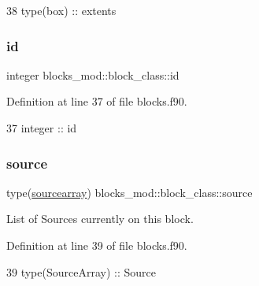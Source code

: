 \begin{DoxyCode}
38         \textcolor{keywordtype}{type}(box) :: extents
\end{DoxyCode}
\mbox{\label{structblocks__mod_1_1block__class_addd1a493d56aa1ffd1bc27c56b682065}} 
\subsubsection{\texorpdfstring{id}{id}}
{\footnotesize\ttfamily integer blocks\+\_\+mod\+::block\+\_\+class\+::id\hspace{0.3cm}{\ttfamily [private]}}



Definition at line 37 of file blocks.\+f90.


\begin{DoxyCode}
37         \textcolor{keywordtype}{integer} :: id
\end{DoxyCode}
\mbox{\label{structblocks__mod_1_1block__class_a398a25c84b76ebe336c1384552bda602}} 
\subsubsection{\texorpdfstring{source}{source}}
{\footnotesize\ttfamily type(\mbox{\hyperlink{structsources__array__mod_1_1sourcearray}{sourcearray}}) blocks\+\_\+mod\+::block\+\_\+class\+::source\hspace{0.3cm}{\ttfamily [private]}}



List of Sources currently on this block. 



Definition at line 39 of file blocks.\+f90.


\begin{DoxyCode}
39         \textcolor{keywordtype}{type}(SourceArray) :: Source
\end{DoxyCode}
\mbox{\label{structblocks__mod_1_1block__class_ac1deffab20b882618041f0dcc0e58c22}} 
